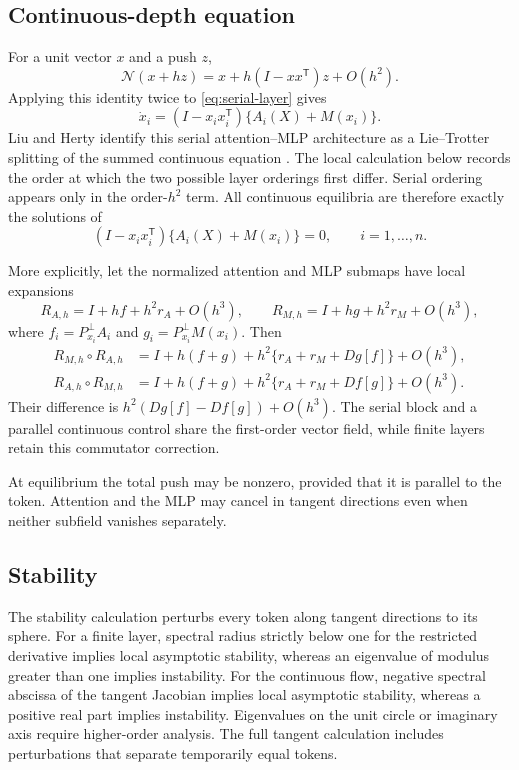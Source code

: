 \documentclass[11pt,a4paper]{article}
\theoremstyle{definition}
\newcommand{\T}{\mathsf T}
\newcommand{\N}{\mathcal N}
\begin{document}
\subsection{Continuous-depth equation}

For a unit vector $x$ and a push $z$,
\[
 \N(x+hz)=x+h(I-xx^{\T})z+O(h^2).
\]
Applying this identity twice to \eqref{eq:serial-layer} gives
\begin{equation}
 \boxed{\quad\dot x_i=(I-x_ix_i^{\T})\{A_i(X)+M(x_i)\}.\quad}\label{eq:continuous}
\end{equation}
Liu and Herty identify this serial attention--MLP architecture as a Lie--Trotter
splitting of the summed continuous equation \cite{herty2026meanfield}.  The local
calculation below records the order at which the two possible layer orderings first
differ.
Serial ordering appears only in the order-$h^2$ term. All continuous equilibria are
therefore exactly the solutions of
\begin{equation}
 \boxed{\quad(I-x_ix_i^{\T})\{A_i(X)+M(x_i)\}=0,
 \qquad i=1,\ldots,n.\quad}\label{eq:continuous-equilibrium}
\end{equation}

More explicitly, let the normalized attention and MLP submaps have local expansions
\[
 R_{A,h}=I+hf+h^2r_A+O(h^3),\qquad
 R_{M,h}=I+hg+h^2r_M+O(h^3),
\]
where $f_i=P_{x_i}^{\perp}A_i$ and $g_i=P_{x_i}^{\perp}M(x_i)$.  Then
\begin{align}
 R_{M,h}\circ R_{A,h}
 &=I+h(f+g)+h^2\{r_A+r_M+Dg[f]\}+O(h^3),\\
 R_{A,h}\circ R_{M,h}
 &=I+h(f+g)+h^2\{r_A+r_M+Df[g]\}+O(h^3).
\end{align}
Their difference is
$h^2(Dg[f]-Df[g])+O(h^3)$.  The serial block and a parallel continuous control share
the first-order vector field, while finite layers retain this commutator correction.

At equilibrium the total push may be nonzero, provided that it is parallel to the
token. Attention and the MLP may cancel in tangent directions even when neither
subfield vanishes separately.

\subsection{Stability}

The stability calculation perturbs every token along tangent directions to its
sphere.  For a finite layer, spectral radius strictly below one for the restricted
derivative implies local asymptotic stability, whereas an eigenvalue of modulus
greater than one implies instability.  For the continuous flow, negative spectral
abscissa of the tangent Jacobian implies local asymptotic stability, whereas a
positive real part implies instability.  Eigenvalues on the unit circle or imaginary
axis require higher-order analysis.  The full tangent calculation includes
perturbations that separate temporarily equal tokens.
\end{document}
